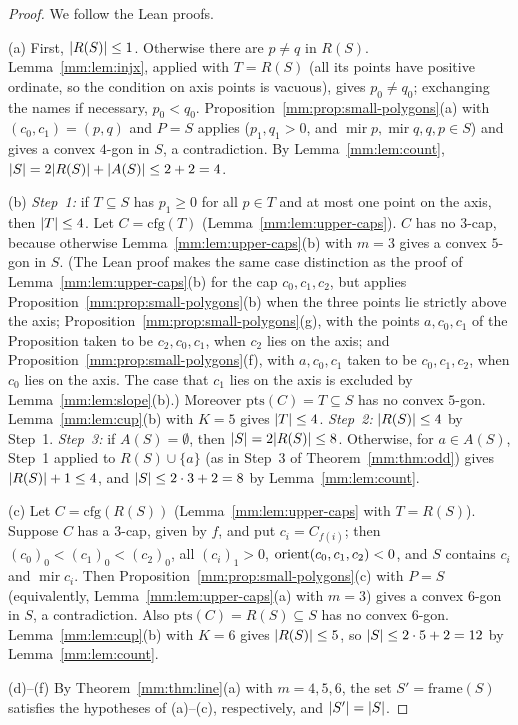 \begin{proof}
We follow the Lean proofs.

(a) First, $\lvert R(S)\rvert\le1$. Otherwise there are $p\ne q$ in $R(S)$. Lemma~\ref{mm:lem:injx}, applied with
$T=R(S)$ (all its points have positive ordinate, so the condition on axis points is vacuous), gives
$p_0\ne q_0$; exchanging the names if necessary, $p_0<q_0$. Proposition~\ref{mm:prop:small-polygons}(a)
with $(c_0,c_1)=(p,q)$ and $P=S$ applies ($p_1,q_1>0$, and $\operatorname{mir}p,\operatorname{mir}q,q,p\in S$)
and gives a convex $4$-gon in $S$, a contradiction. By Lemma~\ref{mm:lem:count},
$\lvert S\rvert=2\lvert R(S)\rvert+\lvert A(S)\rvert\le2+2=4$.

(b) \emph{Step~1:} if $T\subseteq S$ has $p_1\ge0$ for all $p\in T$ and at most one point on the axis,
then $\lvert T\rvert\le4$. Let $C=\mathrm{cfg}(T)$ (Lemma~\ref{mm:lem:upper-caps}). $C$ has no $3$-cap, because
otherwise Lemma~\ref{mm:lem:upper-caps}(b) with $m=3$ gives a convex $5$-gon in $S$. (The Lean proof makes
the same case distinction as the proof of Lemma~\ref{mm:lem:upper-caps}(b) for the cap $c_0,c_1,c_2$, but
applies Proposition~\ref{mm:prop:small-polygons}(b) when the three points lie strictly above the axis;
Proposition~\ref{mm:prop:small-polygons}(g), with the points $a,c_0,c_1$ of the Proposition taken to be
$c_2,c_0,c_1$, when $c_2$ lies on the axis; and Proposition~\ref{mm:prop:small-polygons}(f), with
$a,c_0,c_1$ taken to be $c_0,c_1,c_2$, when $c_0$ lies on the axis. The case that $c_1$ lies on the axis
is excluded by Lemma~\ref{mm:lem:slope}(b).) Moreover $\mathrm{pts}(C)=T\subseteq S$ has no convex $5$-gon.
Lemma~\ref{mm:lem:cup}(b) with $K=5$ gives $\lvert T\rvert\le4$.
\emph{Step~2:} $\lvert R(S)\rvert\le4$ by Step~1.
\emph{Step~3:} if $A(S)=\emptyset$, then $\lvert S\rvert=2\lvert R(S)\rvert\le8$. Otherwise, for $a\in A(S)$, Step~1
applied to $R(S)\cup\{a\}$ (as in Step~3 of Theorem~\ref{mm:thm:odd}) gives $\lvert R(S)\rvert+1\le4$, and
$\lvert S\rvert\le2\cdot3+2=8$ by Lemma~\ref{mm:lem:count}.

(c) Let $C=\mathrm{cfg}(R(S))$ (Lemma~\ref{mm:lem:upper-caps} with $T=R(S)$). Suppose $C$ has a $3$-cap,
given by $f$, and put $c_i=C_{f(i)}$; then $(c_0)_0<(c_1)_0<(c_2)_0$, all $(c_i)_1>0$,
$\operatorname{orient}(c_0,c_1,c_2)<0$, and $S$ contains $c_i$ and $\operatorname{mir}c_i$. Then
Proposition~\ref{mm:prop:small-polygons}(c) with $P=S$ (equivalently, Lemma~\ref{mm:lem:upper-caps}(a)
with $m=3$) gives a convex $6$-gon in $S$, a contradiction. Also $\mathrm{pts}(C)=R(S)\subseteq S$ has no
convex $6$-gon. Lemma~\ref{mm:lem:cup}(b) with $K=6$ gives $\lvert R(S)\rvert\le5$, so
$\lvert S\rvert\le2\cdot5+2=12$ by Lemma~\ref{mm:lem:count}.

(d)--(f) By Theorem~\ref{mm:thm:line}(a) with $m=4,5,6$, the set $S'=\mathrm{frame}(S)$ satisfies the
hypotheses of (a)--(c), respectively, and $\lvert S'\rvert=\lvert S\rvert$.
\end{proof}

